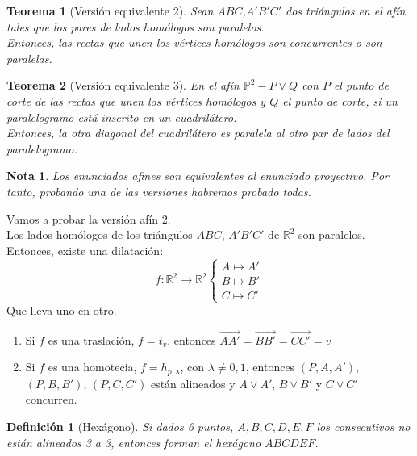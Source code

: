 \documentclass[11pt, a4paper]{article}
\makeatletter
\newif\IfInSansMode
\let\oldsf\sffamily
\renewcommand*{\sffamily}{\oldsf\mathversion{sans}\InSansModetrue}
\let\oldnorm\normalfont
\renewcommand*{\normalfont}{\oldnorm\InSansModefalse\mathversion{normal}}
\renewenvironment{proof}[1][\proofname] {\vspace{-15pt}\par\pushQED{\qed}\normalfont\topsep6\p@\@plus6\p@\relax\trivlist\item[\hskip\labelsep\it#1\@addpunct{.}]\ignorespaces}{\popQED\endtrivlist\@endpefalse}
\newcommand{\R}{\mathbb{R}}
\renewcommand{\vec}{\overrightarrow}
\renewenvironment{proof}[1][\proofname] {\par\pushQED{\qed}\normalfont\topsep6\p@\@plus6\p@\relax\trivlist\item[\hskip\labelsep\itshape\sffamily#1\@addpunct{.}]\ignorespaces}{\popQED\endtrivlist\@endpefalse}
\theoremstyle{theorem-style}
\newtheorem{nth}{Teorema}[section]
\theoremstyle{definition-style}
\newtheorem{ndef}{Definición}[section]
\theoremstyle{remark-style}
\newtheorem*{nota}{Nota}
\theoremstyle{example-style}
\makeatother
\begin{document}
\begin{nth}[Versión equivalente 2]
	Sean $ABC$,$A'B'C'$ dos triángulos en el afín tales que los pares de lados homólogos son paralelos.\\
	Entonces, las rectas que unen los vértices homólogos son concurrentes o son paralelas.
\end{nth}


\begin{nth}[Versión equivalente 3]
	En el afín $\mathbb P^2 - P\vee Q$ con $P$ el punto de corte de las rectas que unen los vértices homólogos y $Q$  el punto de corte, si un paralelogramo está inscrito en un cuadrilátero.\\
	Entonces, la otra diagonal del cuadrilátero es paralela al otro par de lados del paralelogramo.
\end{nth}

\begin{nota}
	Los enunciados afines son equivalentes al enunciado proyectivo. Por tanto, probando una de las versiones habremos probado todas.
\end{nota}
\begin{proof}
	Vamos a probar la versión afín 2.\\
	Los lados homólogos de los triángulos $ABC$, $A'B'C'$ de $\R^2$ son paralelos. Entonces, existe una dilatación:
	\[
	f: \R^2 \to \R^2 \begin{cases}
	A \mapsto A'\\
	B \mapsto B'\\
	C \mapsto C'
	
\end{cases}
	\]
	Que lleva uno en otro.
	\begin{enumerate}
	\item Si $f$ es una traslación, $f = t_v$, entonces $\vec{AA'}= \vec{BB'} = \vec{CC'}=v$
	\item Si $f$ es una homotecia, $f= h_{p,\lambda}$, con $\lambda \ne 0, 1$, entonces $(P,A,A')$, $(P,B,B')$, $(P,C,C')$ están alineados y $A\vee A'$, $B \vee B'$ y $C \vee C'$ concurren.
\end{enumerate}
\end{proof}

\begin{ndef}[Hexágono]
    Si dados 6 puntos, $A,B,C,D,E,F$ los consecutivos no están alineados 3 a 3, entonces forman el hexágono $ABCDEF$.
\end{ndef}
\end{document}

